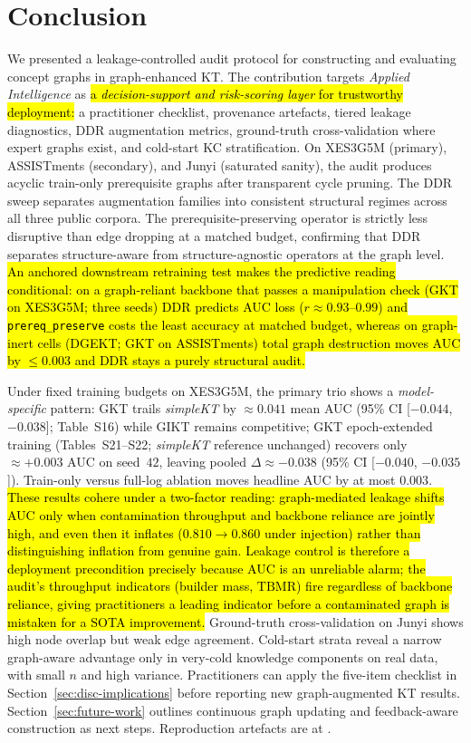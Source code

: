 \documentclass[pdflatex,sn-mathphys-num]{sn-jnl}
\newcommand{\KCs}{knowledge components}
\newcommand{\DDR}{\textsc{DDR}}
\newcommand{\GKTdeltaci}{[$-0.044$, $-0.038$]}
\newcommand{\GKTthirtydeltavec}{-0.038}
\newcommand{\GKTthirtydeltaci}{[$-0.040$, $-0.035$]}
\newcommand{\GKTepochgain}{+0.003}
\newcommand{\rev}[1]{\hl{#1}}
\newcommand{\rev}[1]{#1}
\begin{document}
\section{Conclusion}
\label{sec:concl}
We presented a leakage-controlled audit protocol for constructing and
evaluating concept graphs in graph-enhanced KT. The contribution targets
\textit{Applied Intelligence} as \rev{a \emph{decision-support and risk-scoring
layer} for trustworthy deployment:} a
practitioner checklist, provenance artefacts, tiered leakage diagnostics,
\DDR{} augmentation metrics, ground-truth cross-validation where expert graphs
exist, and cold-start KC stratification. On XES3G5M (primary), ASSISTments (secondary), and Junyi (saturated sanity),
the audit produces acyclic train-only prerequisite graphs after transparent
cycle pruning. The \DDR{} sweep separates augmentation families into
consistent structural regimes across all three public corpora. The
prerequisite-preserving operator is strictly less disruptive than edge dropping
at a matched budget, confirming that \DDR{} separates structure-aware from
structure-agnostic operators at the graph level. \rev{An anchored downstream
retraining test makes the predictive reading conditional: on a graph-reliant
backbone that passes a manipulation check (GKT on XES3G5M; three seeds) \DDR{} predicts AUC
loss (\mbox{$r{\approx}0.93$--$0.99$}) and \mbox{\texttt{prereq\_preserve}} costs the least accuracy at
matched budget, whereas on graph-inert cells (DGEKT; GKT on ASSISTments) total
graph destruction moves AUC by \mbox{${\le}0.003$} and \DDR{} stays a purely
structural audit.}

Under fixed training budgets on XES3G5M, the primary trio shows a
\emph{model-specific} pattern: GKT trails \textit{simpleKT} by
${\approx}0.041$ mean AUC (95\% CI \GKTdeltaci{}; Table~S16) while GIKT
remains competitive; GKT epoch-extended training (Tables~S21--S22;
\textit{simpleKT} reference unchanged) recovers only
${\approx}\GKTepochgain{}$ AUC on seed~$42$, leaving pooled
$\Delta{\approx}\GKTthirtydeltavec{}$ (95\% CI \GKTthirtydeltaci{}). Train-only versus
full-log ablation moves headline AUC by at most $0.003$. \rev{These results cohere
under a two-factor reading: graph-mediated leakage shifts AUC only when
contamination throughput and backbone reliance are jointly high, and even then
it inflates (\mbox{$0.810{\to}0.860$} under injection) rather than distinguishing
inflation from genuine gain. Leakage control is therefore a deployment
precondition precisely because AUC is an unreliable alarm; the audit's
throughput indicators (builder mass, \mbox{$\mathrm{TBMR}$}) fire regardless of
backbone reliance, giving practitioners a leading indicator before a
contaminated graph is mistaken for a SOTA improvement.} Ground-truth
cross-validation on Junyi shows high node overlap but weak edge agreement.
Cold-start strata reveal a narrow graph-aware advantage only in very-cold
\KCs{} on real data, with small $n$ and high variance. Practitioners can apply
the five-item checklist in Section~\ref{sec:disc-implications} before
reporting new graph-augmented KT results. Section~\ref{sec:future-work}
outlines continuous graph updating and feedback-aware construction as next
steps.
Reproduction artefacts are at
.
\end{document}
